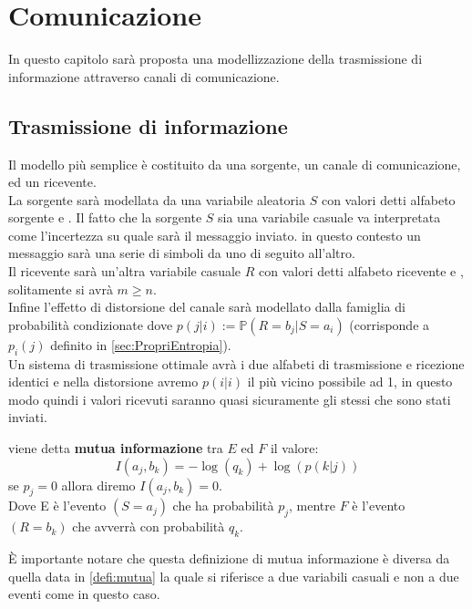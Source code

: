 \chapter{Comunicazione}

In questo capitolo sarà proposta una modellizzazione della trasmissione di informazione attraverso canali di comunicazione. 

\section{Trasmissione di informazione}
\label{sec:Trasmissione}

Il modello più semplice è costituito da una sorgente, un canale di comunicazione, ed un ricevente.\\
La sorgente sarà modellata da una variabile aleatoria $S$ con valori \va detti alfabeto sorgente e \lep. Il fatto che la sorgente $S$ sia una variabile casuale va interpretata come l'incertezza su quale sarà il messaggio inviato. in questo contesto un messaggio sarà una serie di simboli da \va  uno di seguito all'altro.\\
Il ricevente sarà un'altra variabile casuale $R$ con valori \vb  detti alfabeto ricevente e \leggeq, solitamente si avrà $m \geq n$.\\
Infine l'effetto di distorsione del canale sarà modellato dalla famiglia di probabilità condizionate \lepc  dove $p(j|i):= \mathbb{P}(R=b_j|S=a_i)$ (corrisponde a $p_i(j)$ definito in \ref{sec:PropriEntropia}).\\
Un sistema di trasmissione ottimale avrà i due alfabeti di trasmissione e ricezione identici e nella distorsione avremo $p(i|i)$ il più vicino possibile ad 1, in questo modo quindi i valori ricevuti saranno quasi sicuramente gli stessi che sono stati inviati.\\
\begin{defi}
viene detta \textbf{mutua informazione}  tra $E$ ed $F$ il valore:
\begin{equation}
I(a_j,b_k)=- \log(q_k)+ \log(p(k|j))
\end{equation}
se $p_j=0$ allora diremo $I(a_j,b_k)=0$.\\
Dove E è l'evento $(S=a_j)$ che ha probabilità $p_j$, mentre $F$ è l'evento $(R=b_k)$ che avverrà con probabilità $q_k$.
\end{defi}
È importante notare che questa definizione di mutua informazione è diversa da quella data in \ref{defi:mutua} la quale si riferisce a due variabili casuali e non a due eventi come in questo caso.\\
